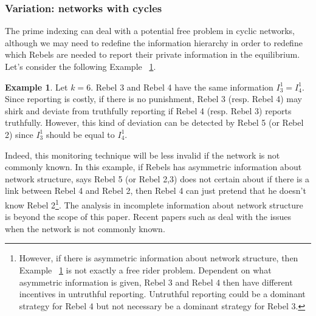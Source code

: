 \documentclass[12pt,letterpaper]{article}
\theoremstyle{definition}
\newtheorem{example}{Example}[section]
\theoremstyle{remark}
\theoremstyle{claim}
\begin{document}
\subsubsection{Variation: networks with cycles}

The prime indexing can deal with a potential free problem in cyclic networks, although we may need to redefine the information hierarchy in order to redefine which Rebels are needed to report their private information in the equilibrium. Let's consider the following Example ~\ref{ex_no_free_rider_cycle}.

\begin{example}
\label{ex_no_free_rider_cycle}
Let $k=6$. Rebel 3 and Rebel 4 have the same information $I^1_3=I^1_4$. Since reporting is costly, if there is no punishment, Rebel 3 (resp. Rebel 4) may shirk and deviate from truthfully reporting if Rebel 4 (resp. Rebel 3) reports truthfully. However, this kind of deviation can be detected by Rebel 5 (or Rebel 2) since $I^1_3$ should be equal to $I^1_4$. 

\begin{center}
\end{center}

\end{example}

Indeed, this monitoring technique will be less invalid if the network is not commonly known. In this example, if Rebels has asymmetric information about network structure, says Rebel 5 (or Rebel 2,3) does not certain about if there is a link between Rebel 4 and Rebel 2, then Rebel 4 can just pretend that he doesn't know Rebel 2\footnote{However, if there is asymmetric information about network structure, then Example ~\ref{ex_no_free_rider_cycle} is not exactly a free rider problem. Dependent on what asymmetric information is given, Rebel 3 and Rebel 4 then have different incentives in untruthful reporting. Untruthful reporting could be a dominant strategy for Rebel 4 but not necessary be a dominant strategy for Rebel 3.}. The analysis in incomplete information about network structure is beyond the scope of this paper. Recent papers such as \citep{Galeotti2010} deal with the issues when the network is not commonly known.
\end{document}
